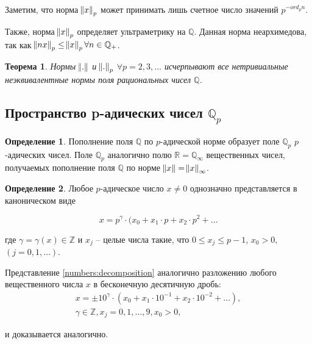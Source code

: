 \documentclass[master, och, diploma, times]{sty/SCWorks}
\theoremstyle{plain}
\newtheorem{thethm}{Теорема}[section]
\theoremstyle{definition}
\newtheorem{defn}{Определение}[section]
\begin{document}
Заметим, что норма $\norm{x}_p$ может принимать лишь счетное число значений $p ^ {-ord_pn}$.

Также, норма $\norm{x}_p$ определяет ультраметрику на $\mathbb {Q}$. Данная норма неархимедова, так как $\norm{nx}_p \le \norm{x}_p \forall n \in \mathbb {Q}_{+}$.

\begin{thethm}
	Нормы $\norm{.}$ и $\norm{.}_p$ $\forall p = 2, 3, \dots$ исчерпывают все нетривиальные неэквивалентные нормы поля рациональных чисел $\mathbb {Q}$.
\end{thethm}


\subsection{Пространство p-адических чисел $\mathbb {Q}_p$}

\begin{defn}
Пополнение поля $\mathbb {Q}$ по $p$-адической норме образует поле $\mathbb {Q}_p$ $p$-адических чисел. Поле $\mathbb {Q}_p$ аналогично полю $\mathbb {R} = \mathbb {Q}_{\infty}$ вещественных чисел, получаемых пополнение поля $\mathbb {Q}$ по норме $\norm{x}=\norm{x}_{\infty}$.
\end{defn}


\begin{defn}
Любое $p$-адическое число $x \ne 0$ однозначно представляется в каноническом виде

\begin{equation} \label{numbers:decomposition}
	x = p^{\gamma} \cdot (x_0 + x_1\cdot p + x_2 \cdot p^2 + \dots
\end{equation}

\noindent где $\gamma = \gamma(x) \in \mathbb {Z}$ и $x_j$ -- целые числа такие, что $0 \le x_j \le p-1$, $x_0 > 0,$ \linebreak $(j=0,1,\dots)$. 
\end{defn}

Представление \eqref{numbers:decomposition} аналогично разложению любого вещественного числа $x$ в бесконечную десятичную дробь:
\begin{equation*}
\begin{aligned}
	x=\pm10^\gamma \cdot (x_0 + x_1 \cdot 10^{-1} + x_2 \cdot 10^{-2} + \dots),\\
	\gamma \in \mathbb {Z}, x_j = 0, 1, \dots, 9, x_0 > 0,
\end{aligned}
\end{equation*}

\noindent и доказывается аналогично.
\end{document}
